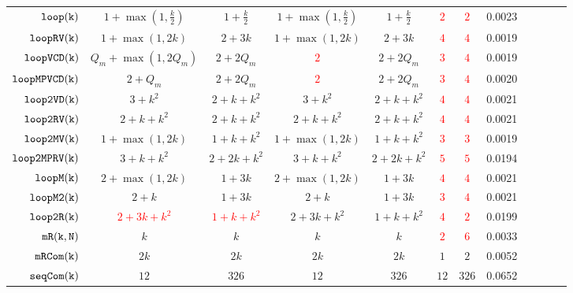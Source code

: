 {\begin {table}[H]
\begin{center}
{\begin{tabular}{ | >{\tiny}r | c | c | c | c | c | c | c | c | c | c | c |}
         $  \mathtt{loop(k)}$ &    $1 + \max(1, \frac{k}{2}) $  &  $1+\frac{k}{2} $ & $1 + \max(1, \frac{k}{2}) $  &  $1+\frac{k}{2} $ & \textcolor{red}{$2$} & \textcolor{red}{$2$} & 0.0023 \\
         $  \mathtt{loopRV(k)}$   &  $ 1 + \max(1,2k)$ & $2 + 3 k$  &  $ 1 + \max(1,2k)$ & $2 + 3 k$ & \textcolor{red}{$4$} & \textcolor{red}{$4$} & 0.0019 \\
         $  {\mathtt{loopVCD(k)}} $  &  ${Q_m+\max(1,2Q_m)}$  & $2+2Q_m$  & \textcolor{red}{$2$} & $2+2Q_m$ & \textcolor{red}{$3$} & \textcolor{red}{$4$} & 0.0019 \\
         $ {\mathtt{loopMPVCD(k)}}$  &  $2 + Q_m$  & $2+2Q_m$  & \textcolor{red}{$2$} & $2+2Q_m$ & \textcolor{red}{$3$} & \textcolor{red}{$4$} & 0.0020 \\
         $  \mathtt{loop2VD(k)}$  &   $3 + k^2$ & $2 + k + k^2$   &  $3 + k^2$ & $2 + k + k^2$  & \textcolor{red}{$4$} & \textcolor{red}{$4$} & 0.0021 \\
         $  \mathtt{loop2RV(k)}$  &  $ 2 + k +  k^2 $    &  $2 + k + k^2$   &  $ 2 + k +  k^2 $    &  $2 + k + k^2$ & \textcolor{red}{$4$} & \textcolor{red}{$4$} & 0.0021 \\
         $  \mathtt{loop2MV(k)}$  & $1 + \max(1,2k) $ &  $1 + k + k^2$ & $1 + \max(1,2k) $ &  $1 + k + k^2$ & \textcolor{red}{$3$} & \textcolor{red}{$3$} & 0.0019 \\
         $ \mathtt{loop2MPRV(k)}$  &  $3 + k + k^2  $ &  $2 + 2k + k^2$  &  $3 + k + k^2  $ &  $2 + 2k + k^2$ & \textcolor{red}{$5$} &\textcolor{red}{$5$}  & 0.0194  \\
         {$ \mathtt{loopM(k)}$}  &  $ 2 + \max(1,2k) $ & $1 + 3k  $  &   $ 2 + \max(1,2k) $ & $1 + 3k  $  & \textcolor{red}{$4$} & \textcolor{red}{$4$} & 0.0021 \\
         {$ \mathtt{loopM2(k)}$}  &  $2 + k $ & $1 + 3k$  &  $2 + k $ & $1 + 3k$ & \textcolor{red}{$3$} & \textcolor{red}{$4$} & 0.0021 \\
         {$\mathtt{loop2R(k)}$}&  \textcolor{red}{$2 + 3k + k^2$} &  \textcolor{red}{$1 + k + k^2$}  &  $2 + 3k + k^2$ &  $1 + k + k^2$ & \textcolor{red}{$4$} & \textcolor{red}{$2$} & 0.0199 \\
         $  \mathtt{mR(k, N)}$ & $ k   $ & $k $   &  $ k   $ & $k $ & \textcolor{red}{$2$} & \textcolor{red}{$6$} & 0.0033 \\
         $  \mathtt{mRCom(k)}$  & $2k $ & $ 2k $   &  $  2k $ & $ 2k $ & $1$ & $2$ & 0.0052 \\
         $  \mathtt{seqCom(k)}$ & $12  $  & $326 $  &   $12  $  & $326 $ &$12  $  & $326 $ & 0.0652 \\

\end{tabular}}
\end{center}
\end{table}}
